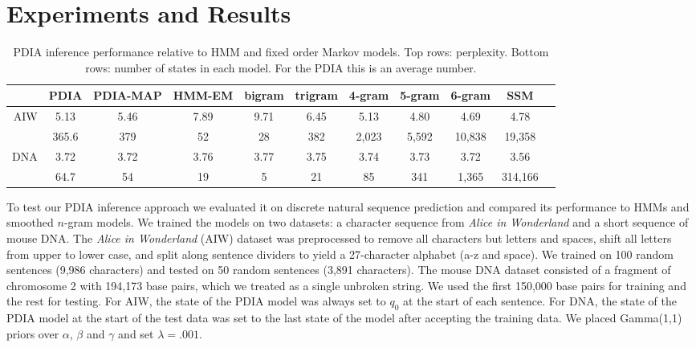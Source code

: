 \section{Experiments and Results}
\label{sec:results}


\begin{table}[t]
    \begin{center}
    \setlength{\tabcolsep}{1.3mm}
\begin{tabular}{r|cccccccccc}
\hline
& PDIA  & PDIA-MAP &  HMM-EM & bigram& trigram & 4-gram & 5-gram & 6-gram & SSM \\
\hline
AIW & 5.13 & 5.46 &  7.89 & 9.71 & 6.45 & 5.13 & 4.80 & 4.69 & 4.78 \\
  & 365.6 & 379 & 52 & 28 & 382 & 2,023 & 5,592 & 10,838 & 19,358 \\
\hline
\hline
DNA & 3.72 & 3.72 &  3.76 & 3.77 & 3.75 & 3.74 & 3.73 & 3.72 & 3.56 \\
 & 64.7 & 54 & 19 &  5 & 21 & 85 & 341 & 1,365 & 314,166 \\
\hline
\end{tabular}
\end{center}
\caption[Short]{PDIA inference performance relative to HMM and fixed order Markov models.  Top rows: perplexity.  Bottom rows: number of states in each model.  For the PDIA this is an average number.\label{table:results}}
\end{table}
%
To test our PDIA inference approach we evaluated it on discrete natural sequence prediction and compared its performance to HMMs and smoothed $n$-gram models.  We trained the models on two datasets: a character sequence from {\em Alice in Wonderland} \cite{Carroll1865} and a short sequence of mouse DNA.  The {\em Alice in Wonderland} (AIW) dataset was preprocessed to remove all characters but letters and spaces, shift all letters from upper to lower case, and split along sentence dividers to yield a 27-character alphabet (a-z and space).  We trained on 100 random sentences (9,986 characters) and tested on 50 random sentences (3,891 characters).   The mouse DNA dataset consisted of a fragment of chromosome 2 with 194,173 base pairs, which we treated as a single unbroken string.  We used the first 150,000 base pairs for training and the rest for testing.  For AIW, the state of the PDIA model was always set to $q_0$ at the start of each sentence.  For DNA, the state of the PDIA model at the start of the test data was set to the last state of the model after accepting the training data.  We placed Gamma(1,1) priors over $\alpha$, $\beta$ and $\gamma$ and set $\lambda=.001$.

